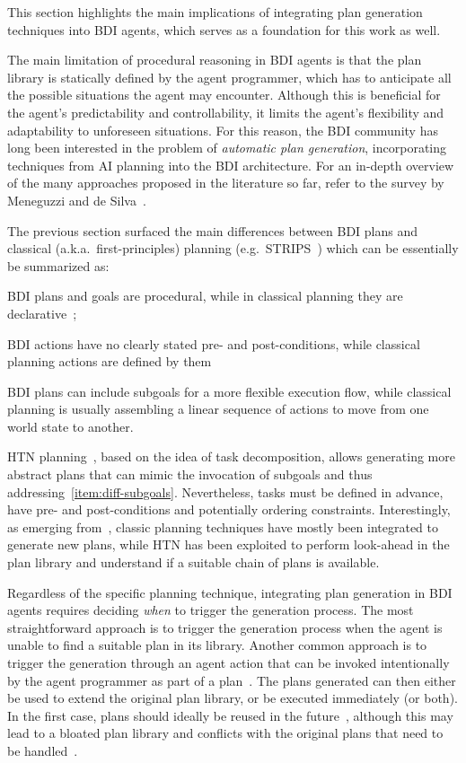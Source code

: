 \documentclass[12pt,a4paper,openright,twoside]{book}
\begin{document}
This section highlights the main implications of integrating plan generation techniques into \ac{BDI} agents, which serves as a foundation for this work as well.

The main limitation of procedural reasoning in \ac{BDI} agents is that the plan library is statically defined by the agent programmer, which has to anticipate all the possible situations the agent may encounter.
%
Although this is beneficial for the agent's predictability and controllability, it limits the agent's flexibility and adaptability to unforeseen situations.
%
For this reason, the \ac{BDI} community has long been interested in the problem of \emph{automatic plan generation}, incorporating techniques from \ac{AI} planning into the \ac{BDI} architecture.
%
For an in-depth overview of the many approaches proposed in the literature so far, refer to the survey by Meneguzzi and de Silva~\cite{MeneguzziS15}.

The previous section surfaced the main differences between \ac{BDI} plans and classical (a.k.a.\ first-principles) planning (e.g.\, STRIPS~\cite{fikes1971ai}) which can be essentially be summarized as:
%
\begin{inlinelist}
    \item \ac{BDI} plans and goals are procedural, while in classical planning they are declarative~\cite{winikoff2002kr};
    \item \ac{BDI} actions have no clearly stated pre- and post-conditions, while classical planning actions are defined by them
    \item\label{item:diff-subgoals} \ac{BDI} plans can include subgoals for a more flexible execution flow, while classical planning is usually assembling a linear sequence of actions to move from one world state to another.
\end{inlinelist}
%
\ac{HTN} planning~\cite{georgievski2015ai}, based on the idea of task decomposition, allows generating more abstract plans that can mimic the invocation of subgoals and thus addressing~\cref{item:diff-subgoals}.
%
Nevertheless, tasks must be defined in advance, have pre- and post-conditions and potentially ordering constraints.
%
Interestingly, as emerging from~\cite{MeneguzziS15}, classic planning techniques have mostly been integrated to generate new plans, while \ac{HTN} has been exploited to perform look-ahead in the plan library and understand if a suitable chain of plans is available.

Regardless of the specific planning technique, integrating plan generation in \ac{BDI} agents requires deciding \emph{when} to trigger the generation process.
%
The most straightforward approach is to trigger the generation process when the agent is unable to find a suitable plan in its library.
%
Another common approach is to trigger the generation through an agent action that can be invoked intentionally by the agent programmer as part of a plan~\cite{meneguzzi2008dalt}.
%
The plans generated can then either be used to extend the original plan library, or be executed immediately (or both).
%
In the first case, plans should ideally be reused in the future~\cite{silva2009atal}, although this may lead to a bloated plan library and conflicts with the original plans that need to be handled~\cite{cardoso2019emas}.
\end{document}
